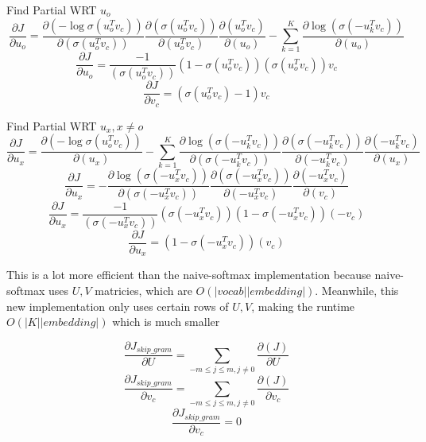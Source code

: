 \documentclass[11pt,largemargins]{homework}
\begin{document}
Find Partial WRT $u_o$ 
$$ \frac{\partial{J}}{\partial{u_o}} = \frac{\partial{(-\log{\sigma{(u_o^T v_c)}})}}{\partial{(\sigma{(u_o^T v_c)})}} \frac{{\partial{(\sigma{(u_o^T v_c)})}}}{\partial{(u_o^T v_c)}}\frac{\partial{(u_o^T v_c)}}{\partial{(u_o)}} - \sum_{k=1}^K \frac{\partial{\log{(\sigma{(-u_k^T v_c)})}}}{\partial{(u_o)}}
$$
$$ \frac{\partial{J}}{\partial{u_o}} = \frac{-1}{(\sigma{(u_o^T v_c)})} (1 - \sigma{(u_o^T v_c)})(\sigma{(u_o^T v_c)})v_c$$
$$ \frac{\partial{J}}{\partial{v_c}} = (\sigma{(u_o^T v_c)} - 1) v_c $$

Find Partial WRT $u_x, x \ne o$ 
$$ \frac{\partial{J}}{\partial{u_x}} = \frac{\partial{(-\log{\sigma{(u_o^T v_c)}})}}{\partial{(u_x)}} - \sum_{k=1}^K \frac{\partial{\log{(\sigma{(-u_k^T v_c)})}}}{\partial{(\sigma{(-u_k^T v_c)})}} \frac{\partial{(\sigma{(-u_k^T v_c)})}} {\partial{(-u_k^T v_c)}} \frac{\partial{(-u_k^T v_c)}}{\partial{(u_x)}}$$
$$ \frac{\partial{J}}{\partial{u_x}} = - \frac{\partial{\log{(\sigma{(-u_x^T v_c)})}}}{\partial{(\sigma{(-u_x^T v_c)})}} \frac{\partial{(\sigma{(-u_x^T v_c)})}} {\partial{(-u_x^T v_c)}} \frac{\partial{(-u_x^T v_c)}}{\partial{(v_c)}}$$
$$ \frac{\partial{J}}{\partial{u_x}} = \frac{-1}{(\sigma{(-u_x^T v_c)})} (\sigma{(-u_x^T v_c)})(1-\sigma{(-u_x^T v_c)}) (-v_c)$$
$$ \frac{\partial{J}}{\partial{u_x}} = (1- \sigma{(-u_x^T v_c)}) (v_c)$$


This is a lot more efficient than the naive-softmax implementation because naive-softmax uses $U, V$ matricies, which are $O(|vocab||embedding|)$. Meanwhile, this new implementation only uses certain rows of $U, V$, making the runtime $O(|K||embedding|)$ which is much smaller

\question

$$ \frac{\partial{J_{skip\_gram}}}{\partial{U}} = \sum_{-m \le j \le m, j \ne 0} \frac{\partial{(J)}}{\partial{U}}$$
$$ \frac{\partial{J_{skip\_gram}}}{\partial{v_c}} = \sum_{-m \le j \le m, j \ne 0} \frac{\partial{(J)}}{\partial{v_c}}$$
$$ \frac{\partial{J_{skip\_gram}}}{\partial{v_c}} = 0 $$
\end{document}
